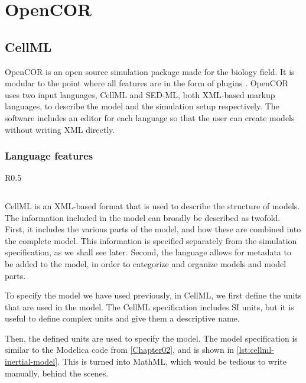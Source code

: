 \documentclass[\rootfolder/main.tex]{subfiles}
\begin{document}
\chapter{OpenCOR} %

\label{Chapter04} %

\section{CellML}

OpenCOR is an open source simulation package made for the biology field.
It is modular to the point where all features are in the form of plugins \cite{10.3389/fphys.2015.00026}.
OpenCOR uses two input languages, CellML and SED-ML, both XML-based markup languages, to describe the model and the simulation setup respectively.
The software includes an editor for each language so that the user can create models without writing XML directly.

\subsection{Language features}

\begin{wraptable}{R}{0.5\columnwidth}
    \inputminted[fontsize=\footnotesize, lastline=27]{matlab}{\rootfolder/Models/OpenCOR/Inertial.input}
\end{wraptable}

CellML \cite{cuellar2003} is an XML-based format that is used to describe the structure of models.
The information included in the model can broadly be described as twofold.
First, it includes the various parts of the model, and how these are combined into the complete model.
This information is specified separately from the simulation specification, as we shall see later.
Second, the language allows for metadata to be added to the model, in order to categorize and organize models and model parts.

To specify the model we have used previously, in CellML, we first define the units that are used in the model.
The CellML specification includes SI units, but it is useful to define complex units and give them a descriptive name.

Then, the defined units are used to specify the model.
The model specification is similar to the Modelica code from \cref{Chapter02}, and is shown in \cref{lst:cellml-inertial-model}.
This is turned into MathML, which would be tedious to write manually, behind the scenes.
\end{document}
